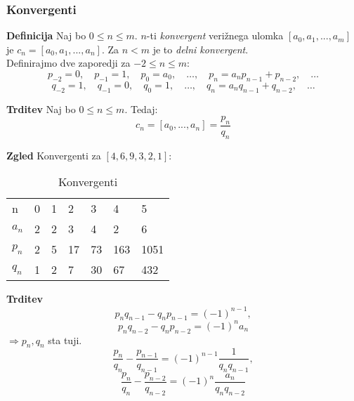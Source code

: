 \documentclass{beamer}
\newenvironment{df}{\begin{block}{\textbf{Definicija}}}{\end{block}}
\newenvironment{zg}{\begin{block}{\textbf{Zgled}}}{\end{block}}
\newenvironment{trd}{\begin{block}{\textbf{Trditev}}}{\end{block}}
\begin{document}
\begin{frame}
	\frametitle{Konvergenti}
	\begin{df}
		Naj bo $0 \leq n \leq m$. $n$-ti \textit{konvergent} verižnega ulomka $[a_0, a_1, ..., a_m]$ je $c_n = [a_0, a_1, ..., a_n]$. Za $n < m$ je to \textit{delni konvergent}.\\
		\vspace{3mm}
		Definirajmo dve zaporedji za $-2\leq n \leq m$:
		\[ p_{-2} = 0, \quad p_{-1} = 1, \quad p_0 = a_0, \quad \dots, \quad p_n = a_{n}p_{n-1} + p_{n-2}, \quad \dots \]
		\[ q_{-2} = 1,\quad q_{-1} = 0,\quad q_0 = 1,\quad \dots,\quad q_n = a_{n}q_{n-1} + q_{n-2},\quad \dots \]
	\end{df}
\pause
	\begin{trd}
	Naj bo $0\leq n \leq m$. Tedaj: \[c_n = [a_0, ..., a_n] = \frac{p_n}{q_n} \]
	\end{trd}
\end{frame}

\begin{frame}
	\begin{zg}
	Konvergenti za $[4,6,9,3,2,1]$:
	\begin{table}[]
	\centering
	\caption{Konvergenti}
	\label{Tabela 1}
	\begin{tabular}{l|llllll}
	n    & 0   & 1   & 2    & 3     & 4      & 5        \\
	$a_n$ & 2   & 2   & 3    & 4     & 2      & 6        \\
	$p_n$ & 2   & 5   & 17   & 73    & 163    & 1051     \\
	$q_n$ & 1   & 2   & 7    & 30    & 67     & 432
		\end{tabular}
		\end{table}
	\end{zg}
\end{frame}

\begin{frame}
	\begin{trd}
	\[ p_n q_{n-1} - q_n p_{n-1} = (-1)^{n-1}, \] 
	\[ p_n q_{n-2} - q_n p_{n-2} = (-1)^n a_n \] \hspace{4cm}$\Rightarrow p_n, q_n$ sta tuji. \vspace{5mm}
	\[ \frac{p_n}{q_n} - \frac{p_{n-1}}{q_{n-1}} = (-1)^{n-1}\frac{1}{q_n q_{n-1}}, \]
	\[ \frac{p_n}{q_n} - \frac{p_{n-2}}{q_{n-2}} = (-1)^{n}\frac{a_n}{q_n q_{n-2}} \]
	\end{trd}
\end{frame}
\end{document}
